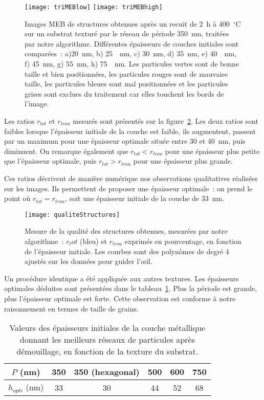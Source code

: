 \begin{figure}[!p]
\centering
\texttt{[image: triMEBlow]}
\texttt{[image: triMEBhigh]}
\caption{Images MEB de structures obtenues après un recuit de 2~h à 400~$^\circ$C sur un substrat texturé par le réseau de période 350~nm, traitées par notre algorithme. Différentes épaisseurs de couches initiales sont comparées~: a)20~nm, b) 25~~nm, c) 30~nm, d) 35~nm, e) 40~~nm, f) 45~nm, g) 55~nm, h) 75~~nm. Les particules vertes sont de bonne taille et bien positionnées, les particules rouges sont de mauvaise taille, les particules bleues sont mal positionnées et les particules grises sont exclues du traitement car elles touchent les bords de l'image.}
\label{triMEB350}
\end{figure}

Les ratios $r_{tot}$ et $r_{trou}$ mesurés sont présentés sur la figure~\ref{qualiteStructures}. Les deux ratios sont faibles lorsque l'épaisseur initiale de la couche est faible, ils augmentent, passent par un maximum pour une épaisseur \og optimale \fg{}  située entre 30 et 40~nm, puis diminuent. On remarque également que $r_{tot}<r_{trou}$ pour une épaisseur plus petite que l'épaisseur optimale, puis $r_{tot}>r_{trou}$ pour une épaisseur plus grande.\par 
Ces ratios décrivent de manière numérique nos observations qualitatives réalisées sur les images. Ils permettent de proposer une épaisseur optimale~: on prend le point où 
$r_{tot}=r_{trou}$, soit une épaisseur initiale de la couche de 33~nm.\par 
\begin{figure}[!htb]
\centering
\texttt{[image: qualiteStructures]}
\caption{Mesure de la qualité des structures obtenues, mesurées par notre algorithme~: $r_tot$ (bleu) et $r_{trou}$ exprimés en pourcentage, en fonction de l’épaisseur initiale. Les courbes sont des polynômes de degré 4 ajustés sur les données pour guider l'œil.}
\label{qualiteStructures}
\end{figure}

Un procédure identique a été appliquée aux autres textures. Les épaisseurs optimales déduites sont présentées dans le tableau~\ref{tOptimaux}. Plus la période est grande, plus l'épaisseur optimale est forte. Cette observation est conforme à notre raisonnement en termes de taille de grains.\par 

\begin{table}[!htb]
\centering
\begin{tabular}{cccccc}
\hline
$P$ (nm) & 350 & 350 (hexagonal) & 500 & 600 & 750 \\
\hline
$h_{opti}$ (nm)&  33 & 30 & 44 & 52 & 68\\
\hline
\end{tabular}
\caption{Valeurs des épaisseurs initiales de la couche métallique donnant les meilleurs réseaux de particules après démouillage, en fonction de la texture du substrat.}
\label{tOptimaux}
\end{table}

